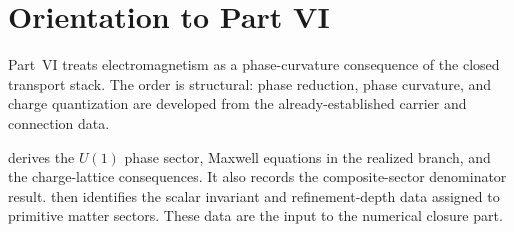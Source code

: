 \chapter*{Orientation to Part VI}
\label{part:intro-electromagnetism}
\begin{chapterorientation}
\end{chapterorientation}

Part~VI treats electromagnetism as a phase-curvature consequence of the
closed transport stack.  The order is structural: phase reduction,
phase curvature, and charge quantization are developed from the
already-established carrier and connection data.

 derives the \(U(1)\) phase sector, Maxwell equations in
the realized branch, and the charge-lattice consequences.  It also
records the composite-sector denominator result.  
then identifies the scalar invariant and refinement-depth data assigned
to primitive matter sectors.  These data are the input to the numerical
closure part.
